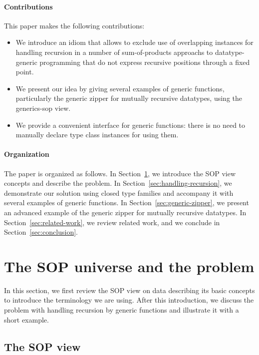 \documentclass[sigplan,review,anonymous]{acmart}\settopmatter{printfolios=true,printccs=false,printacmref=false}
\begin{document}
\paragraph{Contributions} This paper makes the following contributions:
\begin{itemize}
\item We introduce an idiom that allows to exclude use of overlapping instances for handling recursion in a number of sum-of-products approachs to datatype-generic programming that do not express recursive positions through a fixed point.
\item We present our idea by giving several examples of generic functions, particularly the generic zipper for mutually recursive datatypes, using the \textsf{generics-sop} view.
\item We provide a convenient interface for generic functions: there is no need to manually declare type class instances for using them.
\end{itemize}

\paragraph{Organization} The paper is organized as follows. In Section~\ref{sec:sop-problem}, we introduce the SOP view concepts and describe the problem. In Section~\ref{sec:handling-recursion}, we demonstrate our solution using closed type families and accompany it with several examples of generic functions. In Section~\ref{sec:generic-zipper}, we present an advanced example of the generic zipper for mutually recursive datatypes. In Section~\ref{sec:related-work}, we review related work, and we conclude in Section~\ref{sec:conclusion}.


\section{The SOP universe and the problem}
\label{sec:sop-problem}

In this section, we first review the SOP view on data describing its basic concepts to introduce the terminology we are using. After this introduction, we discuss the problem with handling recursion by generic functions and illustrate it with a short example.

\subsection{The SOP view}
\end{document}
